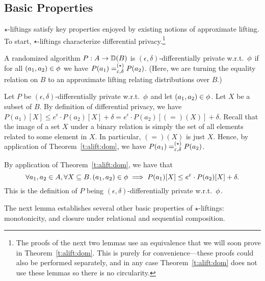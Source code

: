 \documentclass{lmcs}
\begin{document}
\subsection{Basic Properties}

$\star$-liftings satisfy key properties enjoyed by existing notions of
approximate lifting. To start, $\star$-liftings characterize differential
privacy.\footnote{%
  The proofs of the next two lemmas use an equivalence that we will soon prove
in Theorem~\ref{t:alift:dom}. This is purely for convenience---these proofs
could also be performed separately, and in any case Theorem~\ref{t:alift:dom}
does not use these lemmas so there is no circularity.}

\begin{lem} \label{l:alift:dp}
  A randomized algorithm $P : A \to {\mathbb{D}}(B)$ is
  $(\epsilon, \delta)$-differentially private w.r.t.\ $\phi$ if for all
  $(a_1, a_2) \in \phi$ we have
  $P(a_1) \mathrel{=^{(\star)}_{\varepsilon,\delta}} P(a_2)$.
  (Here, we are turning the equality relation on $B$ to an approximate lifting
  relating distributions over $B$.)
\end{lem}

\proofatend
\begin{description}[style=unboxed,leftmargin=0cm]
 \item[($\Longrightarrow$)]
   Let $P$ be $(\epsilon, \delta)$-differentially private w.r.t.\ $\phi$
   and let $(a_1, a_2) \in \phi$. Let $X$ be a subset of $B$. By
   definition of differential privacy, we have
   $P(a_1)[X] \leq e^\epsilon \cdot P(a_2)[X] + \delta
     = e^\epsilon \cdot P(a_2)[(=)(X)] + \delta$.
   Recall that the image of a set $X$ under a binary relation is simply the set
   of all elements related to some element in $X$. In particular, $(=)(X)$ is
   just $X$. Hence, by application of Theorem~\ref{t:alift:dom}, we have $P(a_1)
   \mathrel{=^{(\star)}_{\varepsilon,\delta}} P(a_2)$.
 \item[($\Longleftarrow$)]
   By application of Theorem~\ref{t:alift:dom}, we have that
   \[ \forall a_1, a_2 \in A,
        \forall X \subseteq B .\, (a_1,a_2) \in \phi
        \implies P(a_1)[X] \leq e^\varepsilon \cdot P(a_2)[X] + \delta
        . \]
   This is the definition of $P$ being
   $(\epsilon, \delta)$-differentially private w.r.t.\ $\phi$. \qedhere
\end{description}
\endproofatend

The next lemma establishes several other basic properties of $\star$-liftings:
monotonicity, and closure under relational and sequential composition.
\end{document}
